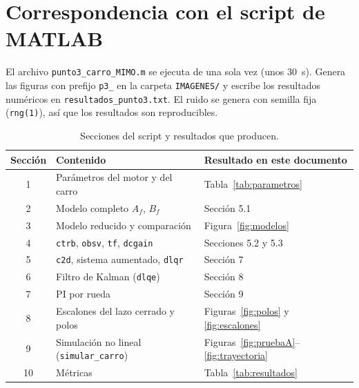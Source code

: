 \documentclass[11pt,letterpaper]{article}
\begin{document}
\appendix
\section{Correspondencia con el script de MATLAB}
\label{ap:script}
El archivo \texttt{punto3\_carro\_MIMO.m} se ejecuta de una sola vez (unos 30~s). Genera las figuras con prefijo \texttt{p3\_} en la carpeta \texttt{IMAGENES/} y escribe los resultados numéricos en \texttt{resultados\_punto3.txt}. El ruido se genera con semilla fija (\texttt{rng(1)}), así que los resultados son reproducibles.

\begin{table}[H]
\centering
\caption{Secciones del script y resultados que producen.}
\begin{tabular}{c l l}
\toprule
Sección & Contenido & Resultado en este documento \\
\midrule
1 & Parámetros del motor y del carro & Tabla~\ref{tab:parametros} \\
2 & Modelo completo $A_f$, $B_f$ & Sección 5.1 \\
3 & Modelo reducido y comparación & Figura~\ref{fig:modelos} \\
4 & \texttt{ctrb}, \texttt{obsv}, \texttt{tf}, \texttt{dcgain} & Secciones 5.2 y 5.3 \\
5 & \texttt{c2d}, sistema aumentado, \texttt{dlqr} & Sección 7 \\
6 & Filtro de Kalman (\texttt{dlqe}) & Sección 8 \\
7 & PI por rueda & Sección 9 \\
8 & Escalones del lazo cerrado y polos & Figuras~\ref{fig:polos} y \ref{fig:escalones} \\
9 & Simulación no lineal (\texttt{simular\_carro}) & Figuras~\ref{fig:pruebaA}--\ref{fig:trayectoria} \\
10 & Métricas & Tabla~\ref{tab:resultados} \\
\bottomrule
\end{tabular}
\end{table}
\end{document}
